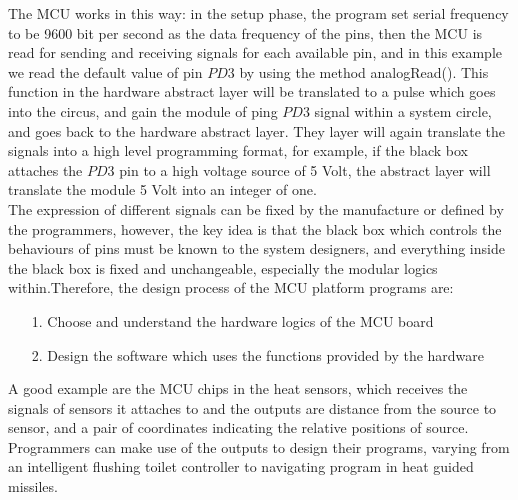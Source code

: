 \documentclass[11pt,openright,a4paper]{report}
\begin{document}
The MCU works in this way: in the setup phase, the program set serial frequency to be 9600 bit per second as the data frequency of the pins, then the MCU is read for sending and receiving signals for each available pin, and in this example we read the default value of pin $PD3$ by using the method analogRead(). This function in the hardware abstract layer will be translated to a pulse which goes into the circus, and gain the module of ping $PD3$ signal within a system circle, and goes back to the hardware abstract layer. They layer will again translate the signals into a high level programming format, for example, if the black box attaches the $PD3$ pin to a high voltage source of 5 Volt, the abstract layer will translate the module 5 Volt into an integer of one.\\
The expression of different signals can be fixed by the manufacture or defined by the programmers, however, the key idea is that the black box which controls the behaviours of pins must be known to the system designers, and everything inside the black box is fixed and unchangeable, especially the modular logics within.Therefore, the design process of the MCU platform programs are:
\begin{itemize}
	\item[1.] Choose and understand the hardware logics of the MCU board
	\item[2.] Design the software which uses the functions provided by the hardware
\end{itemize}
A good example are the MCU chips in the heat sensors, which receives the signals of sensors it attaches to and the outputs are distance from the source to sensor, and a pair of coordinates indicating the relative positions of source. Programmers can make use of the outputs to design their programs, varying from an intelligent flushing toilet controller to navigating program in heat guided missiles.\\ 
\end{document}
